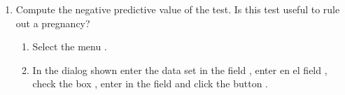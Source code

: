 \begin{enumerate}[leftmargin=*]
\begin{enumerate}
\item Compute the negative predictive value of the test.
Is this test useful to rule out a pregnancy?
\begin{indication}
\begin{enumerate}
\item Select the menu .
\item In the dialog shown enter the data set  in the field , enter
 en el field , check the box , enter
 in the field  and click the button .
\end{enumerate}
\end{indication} 
\end{enumerate} 

\end{enumerate}



